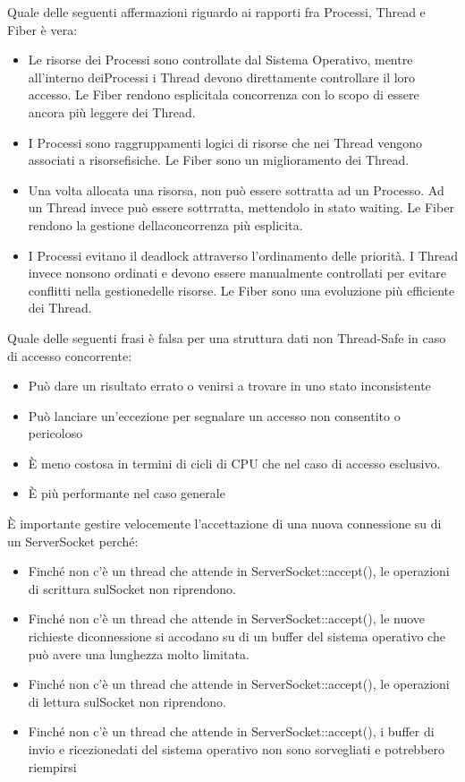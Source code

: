 \documentclass{article}
\begin{document}
Quale delle seguenti affermazioni riguardo ai rapporti fra Processi, Thread e Fiber è vera:
\begin{itemize}
	\item \checkmark Le risorse dei Processi sono controllate dal Sistema Operativo, mentre all'interno deiProcessi i Thread devono direttamente controllare il loro accesso. Le Fiber rendono esplicitala concorrenza con lo scopo di essere ancora più leggere dei Thread.
	\item I Processi sono raggruppamenti logici di risorse che nei Thread vengono associati a risorsefisiche. Le Fiber sono un miglioramento dei Thread.
	\item Una volta allocata una risorsa, non può essere sottratta ad un Processo. Ad un Thread invece può essere sottrratta, mettendolo in stato waiting. Le Fiber rendono la gestione dellaconcorrenza più esplicita.
	\item I Processi evitano il deadlock attraverso l'ordinamento delle priorità. I Thread invece nonsono ordinati e devono essere manualmente controllati per evitare conflitti nella gestionedelle risorse. Le Fiber sono una evoluzione più efficiente dei Thread.
\end{itemize}

Quale delle seguenti frasi è falsa per una struttura dati non Thread-Safe in caso di accesso concorrente:
\begin{itemize}
	\item Può dare un risultato errato o venirsi a trovare in uno stato inconsistente
	\item Può lanciare un'eccezione per segnalare un accesso non consentito o pericoloso
	\item \checkmark È meno costosa in termini di cicli di CPU che nel caso di accesso esclusivo.
	\item È più performante nel caso generale
\end{itemize}

È importante gestire velocemente l'accettazione di una nuova connessione su di un ServerSocket perché:

\begin{itemize}
	\item Finché non c'è un thread che attende in ServerSocket::accept(), le operazioni di scrittura sulSocket non riprendono.
	\item \checkmark Finché non c'è un thread che attende in ServerSocket::accept(), le nuove richieste diconnessione si accodano su di un buffer del sistema operativo che può avere una lunghezza molto limitata.
	\item Finché non c'è un thread che attende in ServerSocket::accept(), le operazioni di lettura sulSocket non riprendono.
	\item Finché non c'è un thread che attende in ServerSocket::accept(), i buffer di invio e ricezionedati del sistema operativo non sono sorvegliati e potrebbero riempirsi
\end{itemize}
\end{document}
